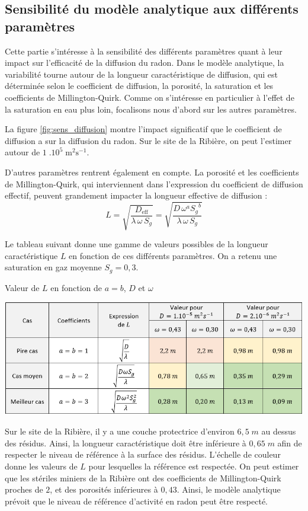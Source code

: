 \documentclass{article}
\begin{document}
\subsection{Sensibilité du modèle analytique aux différents paramètres}
\label{annexe:sens_analytique}

Cette partie s'intéresse à la sensibilité des différents paramètres quant à leur impact sur l'efficacité de la diffusion du radon. Dans le modèle analytique, la variabilité tourne autour de la longueur caractéristique de diffusion, qui est déterminée selon le coefficient de diffusion, la porosité, la saturation et les coefficients de Millington-Quirk. Comme on s'intéresse en particulier à l'effet de la saturation en eau plus loin, focalisons nous d'abord sur les autres paramètres.

La figure \ref{fig:sens_diffusion} montre l'impact significatif que le coefficient de diffusion a sur la diffusion du radon. Sur le site de la Ribière, on peut l'estimer autour de $1 \; .10^5 \; \text{m}^2 \text{s}^{-1}$.

D'autres paramètres rentrent également en compte. La porosité et les coefficients de Millington-Quirk, qui interviennent dans l’expression du coefficient de diffusion effectif, peuvent grandement impacter la longueur effective de diffusion :
$$
L=\sqrt{\frac{D_{\text{eff}}}{\lambda \,\omega\, S_g }}=\sqrt{\frac{D \,\omega^a {S_g}^b}{\lambda\, \omega \,S_g }}
$$

Le tableau suivant donne une gamme de valeurs possibles de la longueur caractéristique $L$ en fonction de ces différents paramètres. On a retenu une saturation en gaz moyenne $S_g=0,3$.

\begin{table}[H]
    \centering
    \caption{Valeur de $L$ en fonction de $a=b$, $D$ et $\omega$}
    \includegraphics[width = \linewidth]{III_C_9.png}

    \label{tab:sens_mq_poro}
\end{table}

Sur le site de la Ribière, il y a une couche protectrice d'environ $6,5\;m$ au dessus des résidus. Ainsi, la longueur caractéristique doit être inférieure à $0,65\;m$ afin de respecter le niveau de référence à la surface des résidus. L'échelle de couleur donne les valeurs de $L$ pour lesquelles la référence est respectée. On peut estimer que les stériles miniers de la Ribière ont des coefficients de Millington-Quirk proches de $2$, et des porosités inférieures à $0,43$. Ainsi, le modèle analytique prévoit que le niveau de référence d'activité en radon peut être respecté.
\end{document}
